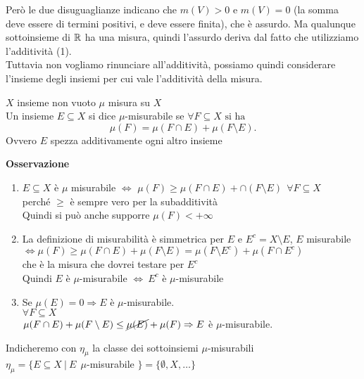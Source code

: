 \documentclass[12px]{article}
\begin{document}
	  Però le due disuguaglianze indicano che $m(V) > 0$ e $m(V) = 0$ (la somma deve essere di termini positivi, e deve essere finita), che è assurdo. Ma qualunque sottoinsieme di $\mathbb{R}$ ha una misura, quindi l'assurdo deriva dal fatto che utilizziamo l'additività (1).\\[10px]
	  Tuttavia non vogliamo rinunciare all'additività, possiamo quindi considerare l'insieme degli insiemi per cui vale l'additività della misura.\\
	  \begin{defi}[Caratheodory]
	  	$X$ insieme non vuoto $\mu$ misura su $X$\\
		Un insieme  $E\subseteq X$ si dice $\mu$-misurabile se $\forall F\subseteq X \text { si ha }$
		\[
			 \mu(F) = \mu(F\cap E) + \mu(F\setminus E) 
		.\] 
		Ovvero $E$ spezza additivamente ogni altro insieme
	  \end{defi}
	  \textbf{Osservazione}\\
	  \begin{enumerate}
		  \item $E\subseteq X$ è  $\mu$ misurabile $ \Leftrightarrow$ $\mu(F)\geq \mu(F\cap E) + \cap (F\setminus E) \ \ \forall F\subseteq X$\\
			  perché $\geq$ è sempre vero per la subadditività\\
			  Quindi si può anche supporre $\mu(F)< + \infty$
		  \item La definizione di misurabilità è simmetrica per  $E$ e $E^c = X\setminus E$,  $E$ misurabile $ \Leftrightarrow\mu(F)\geq \mu(F\cap E) + \mu (F\setminus E) = \mu(F\setminus E^c) + \mu(F\cap E^c)$\\
			  che è la misura che dovrei testare per $E^c$ \\
			  Quindi $E$ è $\mu$-misurabile $ \Leftrightarrow \ E^c$ è $\mu$-misurabile
		  \item Se $\mu(E) = 0  \Rightarrow  E $ è $\mu$-misurabile.\\
			  $\forall F\subseteq X$\\
			  $\mu(F\cap E)+ \mu(F\setminus E)\leq \cancel{\mu(E)} + \mu(F) \Rightarrow E$ è $\mu$-misurabile.\\
	  \end{enumerate}
			  Indicheremo con $\eta_\mu$ la classe dei sottoinsiemi  $\mu$-misurabili\\
			  $\eta_\mu = \{E\subseteq X \ | \ E \ \ \mu$-misurabile $\} = \{\emptyset, X, \ldots\}$
\newpage
\end{document}
